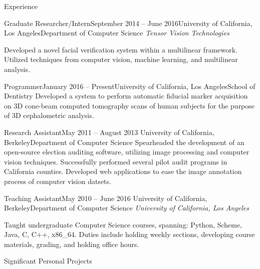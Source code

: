 \documentclass{resume}
\begin{document}
\begin{component}{Experience}
	\begin{position}{Graduate Researcher/Intern}{September 2014 -- June 2016}{University of California, Los Angeles}{Department of Computer Science}
	\emph{Tensor Vision Technologies}

		Developed a novel facial verification system within a multilinear framework. Utilized techniques from computer vision, machine learning, and multilinear analysis.
	\end{position}

    \begin{position}{Programmer}{January 2016 -- Present}{University of California, Los Angeles}{School of Dentistry}
      Developed a system to perform automatic fiducial marker acquisition on 3D cone-beam computed tomography scans of human subjects for the purpose of 3D cephalometric analysis.
      \end{position}


	\begin{position}{Research Assistant}{May 2011 -- August 2013}
	 	{University of California, Berkeley}{Department of Computer Science}
	{Spearheaded the development of an open-source election auditing software,
     utilizing image processing and computer vision techniques. 
     Successfully performed
         several pilot audit programs in California counties.
     Developed web applications to ease the image annotation process of
     computer vision datsets.}
	\end{position}

	\begin{position}{Teaching Assistant}{May 2010 -- June 2016}
		{University of California, Berkeley}{Department of Computer Science}
    \emph{University of California, Los Angeles}

	{Taught undergraduate Computer Science courses, spanning: Python, Scheme, Java, C, C++, x86\_64.
	 Duties include holding weekly sections, developing course materials, grading, and holding office hours.}
	\end{position}

	\begin{position}{Significant Personal Projects}{}
		{}{\vspace{-2.0em}}


\end{position}
\end{component}
\end{document}
